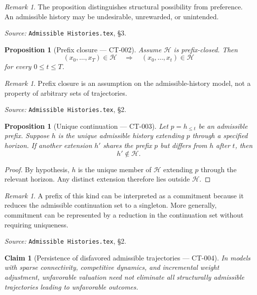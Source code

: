 \documentclass[11pt]{article}
\newtheorem{proposition}[theorem]{Proposition}
\newtheorem{claim}[theorem]{Claim}
\theoremstyle{definition}
\theoremstyle{remark}
\newtheorem{remark}[theorem]{Remark}
\newcommand{\histories}{\mathcal{H}}
\begin{document}
\begin{remark}
The proposition distinguishes structural possibility from preference. An
admissible history may be undesirable, unrewarded, or unintended.
\end{remark}

\noindent\emph{Source:} \texttt{Admissible Histories.tex}, \S3.

\begin{proposition}[Prefix closure --- CT-002]
Assume $\histories$ is prefix-closed. Then
\[
  (x_0,\ldots,x_T)\in\histories
  \quad\Longrightarrow\quad
  (x_0,\ldots,x_t)\in\histories
\]
for every $0\leq t\leq T$.
\end{proposition}

\begin{remark}
Prefix closure is an assumption on the admissible-history model, not a
property of arbitrary sets of trajectories.
\end{remark}

\noindent\emph{Source:} \texttt{Admissible Histories.tex}, \S2.

\begin{proposition}[Unique continuation --- CT-003]
Let $p=h_{\leq t}$ be an admissible prefix. Suppose $h$ is the unique
admissible history extending $p$ through a specified horizon. If another
extension $h'$ shares the prefix $p$ but differs from $h$ after $t$, then
\[
  h'\notin\histories.
\]
\end{proposition}

\begin{proof}
By hypothesis, $h$ is the unique member of $\histories$ extending $p$ through
the relevant horizon. Any distinct extension therefore lies outside
$\histories$.
\end{proof}

\begin{remark}
A prefix of this kind can be interpreted as a commitment because it reduces
the admissible continuation set to a singleton. More generally, commitment
can be represented by a reduction in the continuation set without requiring
uniqueness.
\end{remark}

\noindent\emph{Source:} \texttt{Admissible Histories.tex}, \S2.

\begin{claim}[Persistence of disfavored admissible trajectories --- CT-004]
In models with sparse connectivity, competitive dynamics, and incremental
weight adjustment, unfavorable valuation need not eliminate all structurally
admissible trajectories leading to unfavorable outcomes.
\end{claim}
\end{document}
